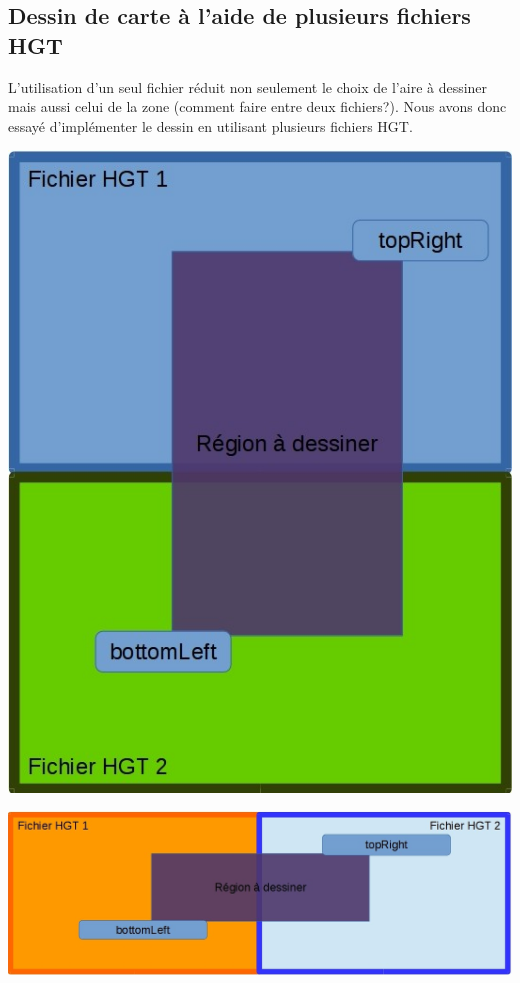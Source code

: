 \documentclass[11pt,a4paper]{article}
\begin{document}
\subsection{Dessin de carte à l'aide de plusieurs fichiers HGT}
L'utilisation d'un seul fichier réduit non seulement le choix de l'aire à dessiner mais aussi celui de la zone (comment faire entre deux fichiers?). Nous avons donc essayé d'implémenter le dessin en utilisant plusieurs fichiers HGT.

\begin{center}
\includegraphics[scale=0.3]{schema4files1.jpg}

\includegraphics[scale=0.3]{schema4files2.jpg}
\end{center}
\end{document}
